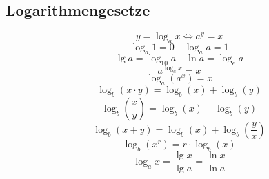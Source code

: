 \subsection{Logarithmengesetze}
\[ \boxed{y=\log_ax \Leftrightarrow a^y=x} \]
\[ \boxed{\log_a1=0 \quad \log_aa=1} \]
\[ \boxed{\lg a=\log_{10}a \quad \ln a = \log_ea} \]
\[ \boxed{a^{\log_ax}=x} \]
\[ \boxed{\log_a\left(a^x\right)=x} \]
\[ \boxed{\log_b(x \cdot y) = \log_b(x) + \log_b(y)} \]
\[ \boxed{\log_b \left( \frac{x}{y} \right) = \log_b(x) - \log_b(y)} \]
\[ \boxed{\log_b(x + y) = \log_b(x) + \log_b\left(\frac{y}{x}\right)} \]
\[ \boxed{\log_b(x^r) = r \cdot \log_b(x)} \]
\[ \boxed{\log_ax=\frac{\lg x}{\lg a}=\frac{\ln x}{\ln a}} \]